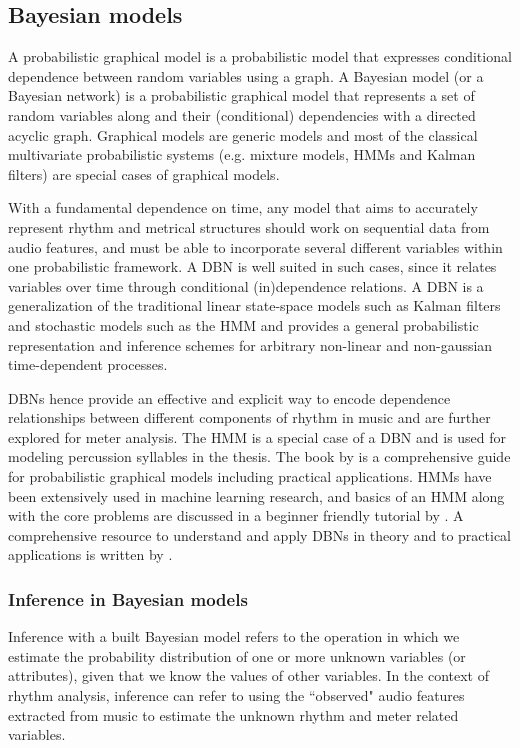 \subsection{Bayesian models}\label{sec:bkgnd:pgm}
A probabilistic graphical model is a probabilistic model that expresses conditional dependence between random variables using a graph. A Bayesian model (or a Bayesian network) is a probabilistic graphical model that represents a set of random variables along and their (conditional) dependencies with a directed acyclic graph. Graphical models are generic models and most of the classical multivariate probabilistic systems (e.g. mixture models, \glspl{HMM} and Kalman filters) are special cases of graphical models. 

With a fundamental dependence on time, any model that aims to accurately represent rhythm and metrical structures should work on sequential data from audio features, and must be able to incorporate several different variables within one probabilistic framework. A \acrfull{DBN} \cite{murphy:02:thesis} is well suited in such cases, since it relates variables over time through conditional (in)dependence relations. A \gls{DBN} is a generalization of the traditional linear state-space models such as Kalman filters and stochastic models such as the \gls{HMM} and provides a general probabilistic representation and inference schemes for arbitrary non-linear and non-gaussian time-dependent processes. 

\glspl{DBN} hence provide an effective and explicit way to encode dependence relationships between different components of rhythm in music and are further explored for meter analysis. The \gls{HMM} is a special case of a \gls{DBN} and is used for modeling percussion syllables in the thesis. The book by  is a comprehensive guide for probabilistic graphical models including practical applications. \glspl{HMM} have been extensively used in machine learning research, and basics of an \gls{HMM} along with the core problems are discussed in a beginner friendly tutorial by . A comprehensive resource to understand and apply \glspl{DBN} in theory and to practical applications is written by .
\subsubsection{Inference in Bayesian models}
Inference with a built Bayesian model refers to the operation in which we estimate the probability distribution of one or more unknown variables (or attributes), given that we know the values of other variables. In the context of rhythm analysis, inference can refer to using the ``observed" audio features extracted from music to estimate the unknown rhythm and meter related variables. 

